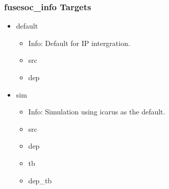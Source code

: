 \subsubsection{fusesoc\_info Targets}
\begin{itemize}
\item default
	\begin{itemize}
	\item[$\space$] Info: Default for IP intergration.
	\item src
	\item dep
	\end{itemize}
\item sim
	\begin{itemize}
	\item[$\space$] Info: Simulation using icarus as the default.
	\item src
	\item dep
	\item tb
	\item dep\_tb
	\end{itemize}
\end{itemize}
